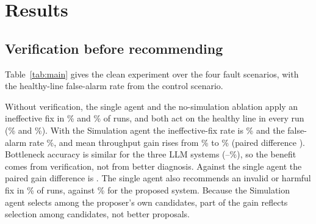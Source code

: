 \documentclass[conference]{IEEEtran}
\begin{document}
\section{Results}
\subsection{Verification before recommending}
Table~\ref{tab:main} gives the clean experiment over the four fault scenarios, with the healthy-line
false-alarm rate from the control scenario.
\begin{table}[t]
\centering\small
\caption{Clean experiment (\Model, \Nseeds{} seeds). Mean [95\% CI]; false alarms are actions taken on the healthy line.}
\label{tab:main}

\end{table}

Without verification, the single agent and the no-simulation ablation apply an ineffective fix in
\IneffSingle\% and \IneffNoSim\% of runs, and both act on the healthy line in every run
(\FalseAlarmSingle\% and \FalseAlarmNoSim\%). With the Simulation agent the ineffective-fix rate is
\IneffMulti\% and the false-alarm rate \FalseAlarmMulti\%, and mean throughput gain rises from \GainNoSim\% to
\GainMulti\% (paired difference \DiffNoSim). Bottleneck accuracy is similar for the three LLM systems
(\AccSingle--\AccMulti\%), so the benefit comes from verification, not from better diagnosis. Against the
single agent the paired gain difference is \DiffSingle. The single agent also recommends an invalid or
harmful fix in \InvalidSingle\% of runs, against \InvalidMulti\% for the proposed system. Because the Simulation agent selects among the
proposer's own candidates, part of the gain reflects selection among candidates, not better proposals.
\end{document}
